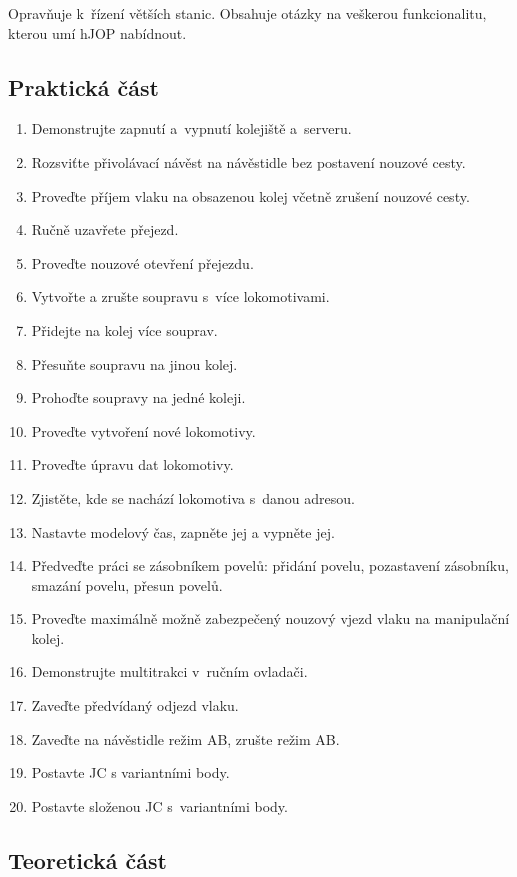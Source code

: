 \documentclass[12pt,a4paper]{article}
\begin{document}
Opravňuje k~řízení větších stanic. Obsahuje otázky na veškerou funkcionalitu,
kterou umí hJOP nabídnout.

\subsection{Praktická část}

\begin{enumerate}[leftmargin=*]
\item Demonstrujte zapnutí a~vypnutí kolejiště a~serveru.
\item Rozsviťte přivolávací návěst na návěstidle bez postavení nouzové cesty.
\item Proveďte příjem vlaku na obsazenou kolej včetně zrušení nouzové cesty.
\item Ručně uzavřete přejezd.
\item Proveďte nouzové otevření přejezdu.
\item Vytvořte a zrušte soupravu s~více lokomotivami.
\item Přidejte na kolej více souprav.
\item Přesuňte soupravu na jinou kolej.
\item Prohoďte soupravy na jedné koleji.
\item Proveďte vytvoření nové lokomotivy.
\item Proveďte úpravu dat lokomotivy.
\item Zjistěte, kde se nachází lokomotiva s~danou adresou.
\item Nastavte modelový čas, zapněte jej a vypněte jej.
\item Předveďte práci se zásobníkem povelů: přidání povelu, pozastavení
zásobníku, smazání povelu, přesun povelů.
\item Proveďte maximálně možně zabezpečený nouzový vjezd vlaku na manipulační
kolej.
\item Demonstrujte multitrakci v~ručním ovladači.
\item Zaveďte předvídaný odjezd vlaku.
\item Zaveďte na návěstidle režim AB, zrušte režim AB.
\item Postavte JC s variantními body.
\item Postavte složenou JC s~variantními body.
\end{enumerate}

\newpage
\subsection{Teoretická část}
\end{document}
